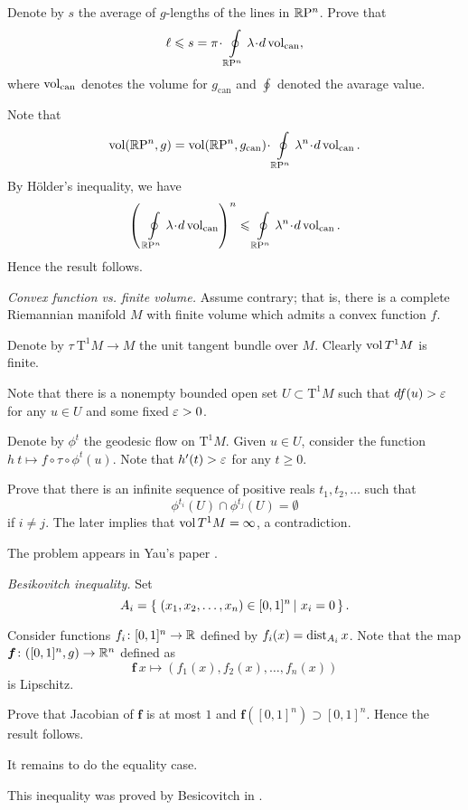 Denote by $s$ the average of $g$-lengths of the lines in $\mathbb{R}\mathrm{P}^n$.
Prove that 
\[\ell \le s=\pi\cdot\oint\limits_{\RP^n}\lambda\cdot d\vol_{\mathrm{can}},\]
where $\operatorname{\rm vol}_{\mathrm{can}}$ denotes the volume for $g_{\mathrm{can}}$ and $\oint$ denoted the avarage value.

Note that
\[\vol(\RP^n,g)=\vol(\RP^n,g_{\mathrm{can}})\cdot\oint\limits_{\RP^n}\lambda^n\cdot d\vol_{\mathrm{can}}.\]
By H\"older's inequality, we have
\[\left(\,\,\oint\limits_{\RP^n}\lambda\cdot d\vol_{\mathrm{can}}\right)^n
\le \oint\limits_{\RP^n}\lambda^n\cdot d\vol_{\mathrm{can}}.\]
Hence the result follows.

\textit{Convex function vs. finite volume.}
Assume contrary; that is, there is a complete Riemannian manifold $M$
with finite volume which admits a convex function $f$.

Denote by $\tau\:\mathrm{T}^1 M\to M$ the unit tangent bundle over $M$. 
Clearly $\operatorname{\rm vol} T^1M$ is finite.

Note that 
there is a nonempty bounded open set $U\subset \mathrm{T}^1 M$
such that $df(u)>\varepsilon$ for any $u\in U$ and some fixed $\varepsilon>0$.

Denote by $\phi^t$ the geodesic flow on $\mathrm{T}^1 M$.
Given $u\in U$,
consider the function $h\:t\mapsto f\circ\tau\circ\phi^t(u)$.
Note that $h'(t)>\varepsilon$ for any $t\ge 0$.

Prove that there is an infinite sequence of positive reals $t_1,t_2,\dots$
such that 
$$\phi^{t_i}(U)\cap\phi^{t_j}(U)=\emptyset$$ 
if $i\ne j$.
The later implies that $\operatorname{\rm vol} T^1M=\infty$,
a contradiction.

 The problem appears in Yau's paper \cite{yau}.

\textit{Besikovitch inequality.}
Set 
\[A_i=\set{(x_1,x_2,\dots,x_n)\in[0,1]^n}{x_i=0}.\]

Consider functions $f_i\colon[0,1]^n\to\mathbb{R}$ defined by
$f_i(x)=\operatorname{\rm dist}_{A_i}x$.
Note that 
the map $\bm{f}\colon([0,1]^n,g)\to\mathbb{R}^n$
defined as
\[\bm{f}\:x\mapsto(f_1(x),f_2(x),\dots,f_n(x))\]
is Lipschitz.

Prove that Jacobian of  $\bm{f}$
is at most $1$
and $\bm{f}([0,1]^n)\supset [0,1]^n$.
Hence the result follows.

It remains to do the equality case.

This inequality was proved by Besicovitch in \cite{besicovitch}.


